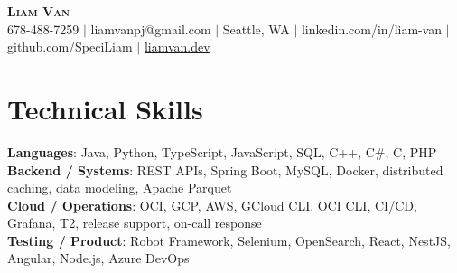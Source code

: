 \documentclass[letterpaper,11pt]{article}
\begin{document}

%
\begin{center}
    \textbf{\Huge \scshape Liam Van} \\ \vspace{1pt}
    \small 678-488-7259 $|$ liamvanpj@gmail.com $|$ Seattle, WA $|$
    linkedin.com/in/liam-van $|$ github.com/SpeciLiam $|$ \href{https://liamvan.dev}{liamvan.dev}

\end{center}

\section{Technical Skills}
 \begin{itemize}[leftmargin=0.15in, label={}]
    \small{\item{
     \textbf{Languages}{: Java, Python, TypeScript, JavaScript, SQL, C++, C\#, C, PHP} \\
     \textbf{Backend / Systems}{: REST APIs, Spring Boot, MySQL, Docker, distributed caching, data modeling, Apache Parquet} \\
     \textbf{Cloud / Operations}{: OCI, GCP, AWS, GCloud CLI, OCI CLI, CI/CD, Grafana, T2, release support, on-call response} \\
     \textbf{Testing / Product}{: Robot Framework, Selenium, OpenSearch, React, NestJS, Angular, Node.js, Azure DevOps} \\
    }}
 \end{itemize}
%

\end{document}

